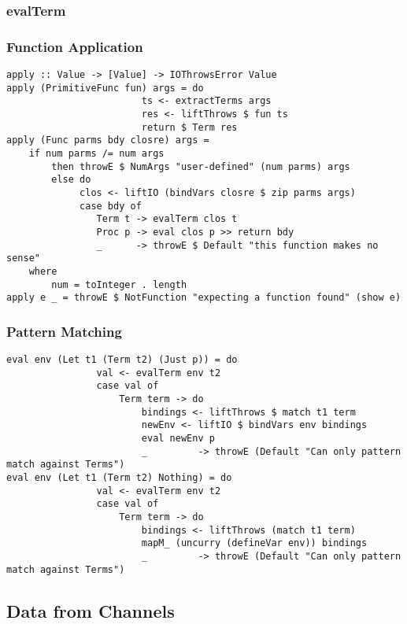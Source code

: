 \subsubsection{evalTerm}

\subsubsection{Function Application}

\begin{verbatim}
apply :: Value -> [Value] -> IOThrowsError Value 
apply (PrimitiveFunc fun) args = do
                        ts <- extractTerms args
                        res <- liftThrows $ fun ts
                        return $ Term res
apply (Func parms bdy closre) args =
    if num parms /= num args 
        then throwE $ NumArgs "user-defined" (num parms) args
        else do
             clos <- liftIO (bindVars closre $ zip parms args)
             case bdy of
                Term t -> evalTerm clos t
                Proc p -> eval clos p >> return bdy
                _      -> throwE $ Default "this function makes no sense"
    where
        num = toInteger . length
apply e _ = throwE $ NotFunction "expecting a function found" (show e)
\end{verbatim}

\subsubsection{Pattern Matching}
\label{sec:letpatterns}

\begin{verbatim}
eval env (Let t1 (Term t2) (Just p)) = do
                val <- evalTerm env t2 
                case val of 
                    Term term -> do
                        bindings <- liftThrows $ match t1 term
                        newEnv <- liftIO $ bindVars env bindings
                        eval newEnv p
                        _         -> throwE (Default "Can only pattern match against Terms")
eval env (Let t1 (Term t2) Nothing) = do 
                val <- evalTerm env t2 
                case val of 
                    Term term -> do
                        bindings <- liftThrows (match t1 term)
                        mapM_ (uncurry (defineVar env)) bindings
                        _         -> throwE (Default "Can only pattern match against Terms")
\end{verbatim}

\subsection{Data from Channels}
\label{sec:sendout}

